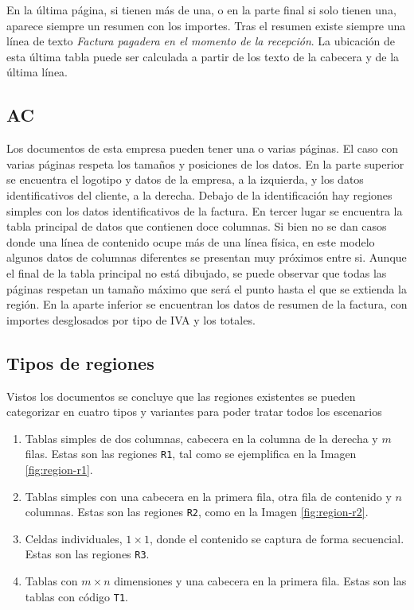 En la última página, si tienen más de una, o en la parte final si solo tienen una, aparece siempre un resumen con los importes. Tras el resumen existe siempre una línea de texto \emph{Factura pagadera en el momento de la recepción}. La ubicación de esta última tabla puede ser calculada a partir de los texto de la cabecera y de la última línea.

\subsection{AC}

Los documentos de esta empresa pueden tener una o varias páginas. El caso con varias páginas respeta los tamaños y posiciones de los datos. En la parte superior se encuentra el logotipo y datos de la empresa, a la izquierda, y los datos identificativos del cliente, a la derecha. Debajo de la identificación hay regiones simples con los datos identificativos de la factura. En tercer lugar se encuentra la tabla principal de datos que contienen doce columnas. Si bien no se dan casos donde una línea de contenido ocupe más de una línea física, en este modelo algunos datos de columnas diferentes se presentan muy próximos entre si. Aunque el final de la tabla principal no está dibujado, se puede observar que todas las páginas respetan un tamaño máximo que será el punto hasta el que se extienda la región. En la aparte inferior se encuentran los datos de resumen de la factura, con importes desglosados por tipo de IVA y los totales.
 
\subsection{Tipos de regiones}

Vistos los documentos se concluye que las regiones existentes se pueden categorizar en cuatro tipos y variantes para poder tratar todos los escenarios

\begin{enumerate}
	\item Tablas simples de dos columnas, cabecera en la columna de la derecha y $m$ filas. Estas son las regiones \verb|R1|, tal como se ejemplifica en la Imagen \ref{fig:region-r1}.
	\item Tablas simples con una cabecera en la primera fila, otra fila de contenido y $n$ columnas. Estas son las regiones \verb|R2|, como en la Imagen \ref{fig:region-r2}.
	\item Celdas individuales, $1\times 1$, donde el contenido se captura de forma secuencial. Estas son las regiones \verb|R3|.
	\item Tablas con $m\times n$ dimensiones y una cabecera en la primera fila. Estas son las tablas con código \verb|T1|.
\end{enumerate}

